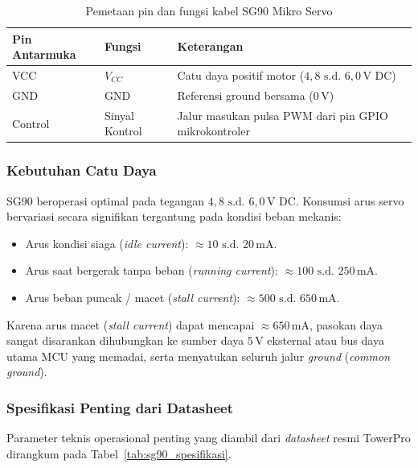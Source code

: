 \begin{table}[H]
	\centering
	\caption{Pemetaan pin dan fungsi kabel SG90 Mikro Servo}
	\label{tab:sg90_pin}
	\small
	\begin{tabularx}{\textwidth}{@{} p{3.2cm} p{2.2cm} X @{}}
		\toprule
		Pin Antarmuka & Fungsi         & Keterangan                                                     \\
		\midrule
		VCC           & $V_{CC}$       & Catu daya positif motor ($4{,}8\text{ s.d. }6{,}0\,\text{V DC}$) \\
		GND           & GND            & Referensi ground bersama ($0\,\text{V}$)                       \\
		Control       & Sinyal Kontrol & Jalur masukan pulsa PWM dari pin GPIO mikrokontroler           \\
		\bottomrule
	\end{tabularx}
\end{table}

\subsubsection{Kebutuhan Catu Daya}
SG90 beroperasi optimal pada tegangan $4{,}8\text{ s.d. }6{,}0\,\text{V DC}$. Konsumsi arus servo bervariasi secara signifikan tergantung pada kondisi beban mekanis:
\begin{itemize}
	\item Arus kondisi siaga (\textit{idle current}): $\approx 10\text{ s.d. }20\,\text{mA}$.
	\item Arus saat bergerak tanpa beban (\textit{running current}): $\approx 100\text{ s.d. }250\,\text{mA}$.
	\item Arus beban puncak / macet (\textit{stall current}): $\approx 500\text{ s.d. }650\,\text{mA}$.
\end{itemize}

Karena arus macet (\textit{stall current}) dapat mencapai $\approx 650\,\text{mA}$, pasokan daya sangat disarankan dihubungkan ke sumber daya $5\,\text{V}$ eksternal atau bus daya utama MCU yang memadai, serta menyatukan seluruh jalur \textit{ground} (\textit{common ground}).

\subsubsection{Spesifikasi Penting dari Datasheet}
Parameter teknis operasional penting yang diambil dari \textit{datasheet} resmi TowerPro dirangkum pada Tabel~\ref{tab:sg90_spesifikasi}.

